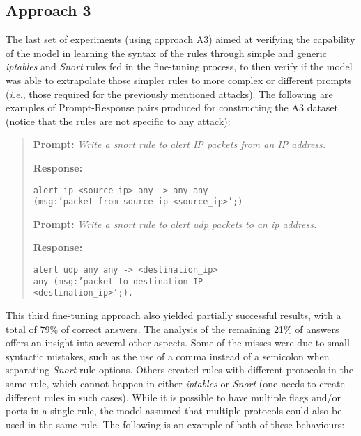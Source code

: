 \documentclass[sigconf]{acmart}
\begin{document}
\subsection{Approach 3}
The last set of experiments (using approach A3) aimed at verifying the capability of the model in learning the syntax of the rules through simple and generic \textit{iptables} and \textit{Snort} rules fed in the fine-tuning process, to then verify if the model was able to extrapolate those simpler rules to more complex or different prompts (\textit{i.e.}, those required for the previously mentioned attacks). The following are
examples of Prompt-Response pairs produced for constructing the A3 dataset (notice that the rules are not specific to any attack):
\begin{quote}
    \textbf{Prompt: } \textit{Write a snort rule to alert IP packets from an IP
address.}

\textbf{Response:}\begin{verbatim}
alert ip <source_ip> any -> any any
(msg:’packet from source ip <source_ip>’;)
\end{verbatim}

    \textbf{Prompt: } \textit{Write a snort rule to alert udp packets to an ip address.}

\textbf{Response:}\begin{verbatim}
alert udp any any -> <destination_ip>
any (msg:’packet to destination IP
<destination_ip>’;).
\end{verbatim}

\end{quote}

This third fine-tuning approach also yielded partially successful results, with a total of 79\% of correct answers. The analysis of the remaining 21\% of answers offers an insight into several other aspects. Some of the misses were due to small syntactic mistakes, such as the use of a comma instead of a semicolon when separating \textit{Snort} rule options. Others created rules with different protocols in the same rule, which cannot happen in either \textit{iptables} or \textit{Snort} (one needs to create different rules in such cases). While it is possible to have multiple flags and/or ports in a single rule, the model assumed that multiple protocols could also be used in the same rule. The following is an example of both of these behaviours:
\end{document}
